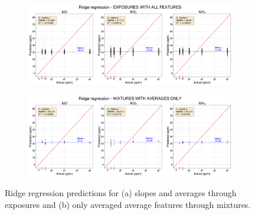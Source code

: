 \begin{figure}[!htb]
	\centering
	
	\begin{subfigure}[t]{1\textwidth}
		\includegraphics[width=1\linewidth]{../figures/ridge-act-vs-pred.png}
		\caption{}
		\label{fig:ridge-act-vs-pred} 
	\end{subfigure}
	
	\begin{subfigure}[t]{1\textwidth}
		\includegraphics[width=1\linewidth]{../figures/ridge-act-vs-pred-avg-feat.png}
		\caption{}
		\label{fig:ridge-act-vs-pred-avg-feat}
	\end{subfigure}
	
	\caption{Ridge regression predictions for (a) slopes and averages through exposures and (b) only averaged average features through mixtures.}
	\label{fig:ridge-actual-vs-pred-both}
\end{figure}




